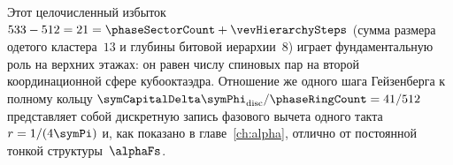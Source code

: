 Этот целочисленный избыток $533 - 512 = 21 = \phaseSectorCount + \vevHierarchySteps$ (сумма размера одетого кластера~$13$ и глубины битовой иерархии~$8$) играет фундаментальную роль на верхних этажах: он равен числу спиновых пар на второй координационной сфере кубооктаэдра.
Отношение же одного шага Гейзенберга к полному кольцу $\symCapitalDelta\symPhi_{\mathrm{disc}}/\phaseRingCount = 41/512$ представляет собой дискретную запись фазового вычета одного такта $r = 1/(4\symPi)$ и, как показано в главе~\ref{ch:alpha}, отлично от постоянной тонкой структуры~$\alphaFs$.
